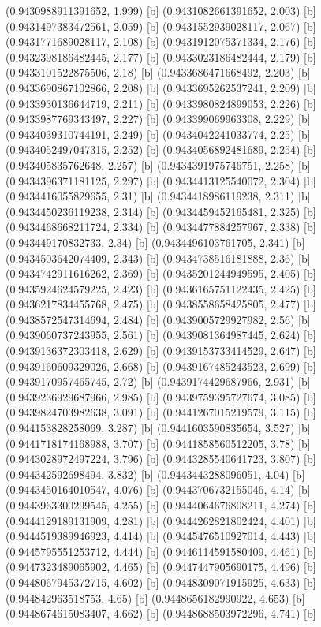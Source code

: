 {{{(0.9430988911391652, 1.999) [b] 
(0.9431082661391652, 2.003) [b] 
(0.9431497383472561, 2.059) [b] 
(0.9431552939028117, 2.067) [b] 
(0.9431771689028117, 2.108) [b] 
(0.9431912075371334, 2.176) [b] 
(0.9432398186482445, 2.177) [b] 
(0.9433023186482444, 2.179) [b] 
(0.9433101522875506, 2.18) [b] 
(0.9433686471668492, 2.203) [b] 
(0.9433690867102866, 2.208) [b] 
(0.9433695262537241, 2.209) [b] 
(0.9433930136644719, 2.211) [b] 
(0.9433980824899053, 2.226) [b] 
(0.9433987769343497, 2.227) [b] 
(0.943399069963308, 2.229) [b] 
(0.9434039310744191, 2.249) [b] 
(0.9434042241033774, 2.25) [b] 
(0.9434052497047315, 2.252) [b] 
(0.9434056892481689, 2.254) [b] 
(0.943405835762648, 2.257) [b] 
(0.9434391975746751, 2.258) [b] 
(0.9434396371181125, 2.297) [b] 
(0.9434413125540072, 2.304) [b] 
(0.9434416055829655, 2.31) [b] 
(0.9434418986119238, 2.311) [b] 
(0.9434450236119238, 2.314) [b] 
(0.9434459452165481, 2.325) [b] 
(0.9434468668211724, 2.334) [b] 
(0.9434477884257967, 2.338) [b] 
(0.943449170832733, 2.34) [b] 
(0.9434496103761705, 2.341) [b] 
(0.9434503642074409, 2.343) [b] 
(0.9434738516181888, 2.36) [b] 
(0.9434742911616262, 2.369) [b] 
(0.9435201244949595, 2.405) [b] 
(0.9435924624579225, 2.423) [b] 
(0.9436165751122435, 2.425) [b] 
(0.9436217834455768, 2.475) [b] 
(0.9438558658425805, 2.477) [b] 
(0.9438572547314694, 2.484) [b] 
(0.9439005729927982, 2.56) [b] 
(0.9439060737243955, 2.561) [b] 
(0.9439081364987445, 2.624) [b] 
(0.9439136372303418, 2.629) [b] 
(0.9439153733414529, 2.647) [b] 
(0.9439160609329026, 2.668) [b] 
(0.9439167485243523, 2.699) [b] 
(0.9439170957465745, 2.72) [b] 
(0.9439174429687966, 2.931) [b] 
(0.9439236929687966, 2.985) [b] 
(0.9439759395727674, 3.085) [b] 
(0.9439824703982638, 3.091) [b] 
(0.9441267015219579, 3.115) [b] 
(0.944153828258069, 3.287) [b] 
(0.9441603590835654, 3.527) [b] 
(0.9441718174168988, 3.707) [b] 
(0.9441858560512205, 3.78) [b] 
(0.9443028972497224, 3.796) [b] 
(0.9443285540641723, 3.807) [b] 
(0.944342592698494, 3.832) [b] 
(0.9443443288096051, 4.04) [b] 
(0.9443450164010547, 4.076) [b] 
(0.9443706732155046, 4.14) [b] 
(0.9443963300299545, 4.255) [b] 
(0.9444064676808211, 4.274) [b] 
(0.9444129189131909, 4.281) [b] 
(0.9444262821802424, 4.401) [b] 
(0.9444519389946923, 4.414) [b] 
(0.9445476510927014, 4.443) [b] 
(0.9445795551253712, 4.444) [b] 
(0.9446114591580409, 4.461) [b] 
(0.9447323489065902, 4.465) [b] 
(0.9447447905690175, 4.496) [b] 
(0.9448067945372715, 4.602) [b] 
(0.9448309071915925, 4.633) [b] 
(0.944842963518753, 4.65) [b] 
(0.9448656182990922, 4.653) [b] 
(0.9448674615083407, 4.662) [b] 
(0.9448688503972296, 4.741) [b] 
}}}
